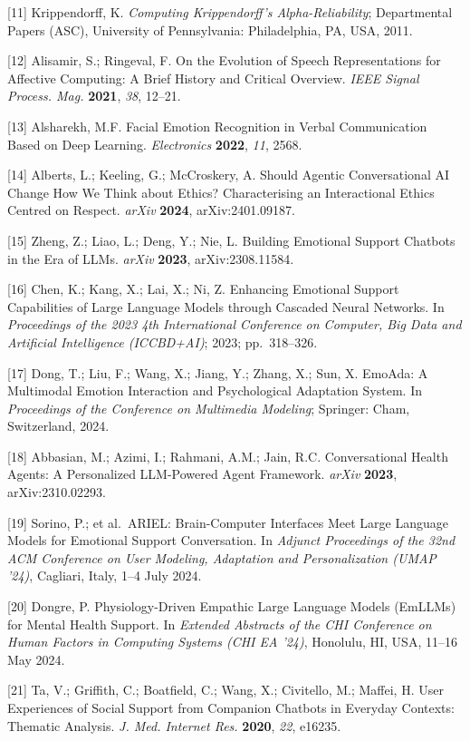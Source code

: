 {[}11{]} Krippendorff, K. \emph{Computing Krippendorff's Alpha-Reliability}; Departmental Papers (ASC), University of Pennsylvania: Philadelphia, PA, USA, 2011.

{[}12{]} Alisamir, S.; Ringeval, F. On the Evolution of Speech Representations for Affective Computing: A Brief History and Critical Overview. \emph{IEEE Signal Process. Mag.} \textbf{2021}, \emph{38}, 12--21.

{[}13{]} Alsharekh, M.F. Facial Emotion Recognition in Verbal Communication Based on Deep Learning. \emph{Electronics} \textbf{2022}, \emph{11}, 2568.

{[}14{]} Alberts, L.; Keeling, G.; McCroskery, A. Should Agentic Conversational AI Change How We Think about Ethics? Characterising an Interactional Ethics Centred on Respect. \emph{arXiv} \textbf{2024}, arXiv:2401.09187.

{[}15{]} Zheng, Z.; Liao, L.; Deng, Y.; Nie, L. Building Emotional Support Chatbots in the Era of LLMs. \emph{arXiv} \textbf{2023}, arXiv:2308.11584.

{[}16{]} Chen, K.; Kang, X.; Lai, X.; Ni, Z. Enhancing Emotional Support Capabilities of Large Language Models through Cascaded Neural Networks. In \emph{Proceedings of the 2023 4th International Conference on Computer, Big Data and Artificial Intelligence (ICCBD+AI)}; 2023; pp.~318--326.

{[}17{]} Dong, T.; Liu, F.; Wang, X.; Jiang, Y.; Zhang, X.; Sun, X. EmoAda: A Multimodal Emotion Interaction and Psychological Adaptation System. In \emph{Proceedings of the Conference on Multimedia Modeling}; Springer: Cham, Switzerland, 2024.

{[}18{]} Abbasian, M.; Azimi, I.; Rahmani, A.M.; Jain, R.C. Conversational Health Agents: A Personalized LLM-Powered Agent Framework. \emph{arXiv} \textbf{2023}, arXiv:2310.02293.

{[}19{]} Sorino, P.; et al.~ARIEL: Brain-Computer Interfaces Meet Large Language Models for Emotional Support Conversation. In \emph{Adjunct Proceedings of the 32nd ACM Conference on User Modeling, Adaptation and Personalization (UMAP '24)}, Cagliari, Italy, 1--4 July 2024.

{[}20{]} Dongre, P. Physiology-Driven Empathic Large Language Models (EmLLMs) for Mental Health Support. In \emph{Extended Abstracts of the CHI Conference on Human Factors in Computing Systems (CHI EA '24)}, Honolulu, HI, USA, 11--16 May 2024.

{[}21{]} Ta, V.; Griffith, C.; Boatfield, C.; Wang, X.; Civitello, M.; Maffei, H. User Experiences of Social Support from Companion Chatbots in Everyday Contexts: Thematic Analysis. \emph{J. Med. Internet Res.} \textbf{2020}, \emph{22}, e16235.

